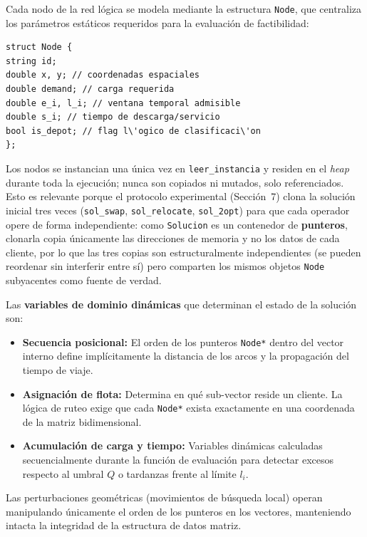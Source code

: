 \documentclass[letter, 10pt]{article}
\begin{document}
Cada nodo de la red l\'ogica se modela mediante la estructura \texttt{Node}, que centraliza los par\'ametros est\'aticos requeridos para la evaluaci\'on de factibilidad:

\begin{verbatim}
struct Node {
string id;
double x, y; // coordenadas espaciales
double demand; // carga requerida
double e_i, l_i; // ventana temporal admisible
double s_i; // tiempo de descarga/servicio
bool is_depot; // flag l\'ogico de clasificaci\'on
};
\end{verbatim}

Los nodos se instancian una \'unica vez en \texttt{leer\_instancia} y residen en el \textit{heap} durante toda la ejecuci\'on; nunca son copiados ni mutados, solo referenciados. Esto es relevante porque el protocolo experimental (Secci\'on~7) clona la soluci\'on inicial tres veces (\texttt{sol\_swap}, \texttt{sol\_relocate}, \texttt{sol\_2opt}) para que cada operador opere de forma independiente: como \texttt{Solucion} es un contenedor de \textbf{punteros}, clonarla copia \'unicamente las direcciones de memoria y no los datos de cada cliente, por lo que las tres copias son estructuralmente independientes (se pueden reordenar sin interferir entre s\'i) pero comparten los mismos objetos \texttt{Node} subyacentes como fuente de verdad.

Las \textbf{variables de dominio din\'amicas} que determinan el estado de la soluci\'on son:

\begin{itemize}
\item \textbf{Secuencia posicional:} El orden de los punteros \texttt{Node*} dentro del vector interno define impl\'icitamente la distancia de los arcos y la propagaci\'on del tiempo de viaje.
\item \textbf{Asignaci\'on de flota:} Determina en qu\'e sub-vector reside un cliente. La l\'ogica de ruteo exige que cada \texttt{Node*} exista exactamente en una coordenada de la matriz bidimensional.
\item \textbf{Acumulaci\'on de carga y tiempo:} Variables din\'amicas calculadas secuencialmente durante la funci\'on de evaluaci\'on para detectar excesos respecto al umbral $Q$ o tardanzas frente al l\'imite $l_i$.
\end{itemize}

Las perturbaciones geom\'etricas (movimientos de b\'usqueda local) operan manipulando \'unicamente el orden de los punteros en los vectores, manteniendo intacta la integridad de la estructura de datos matriz.
\end{document}
